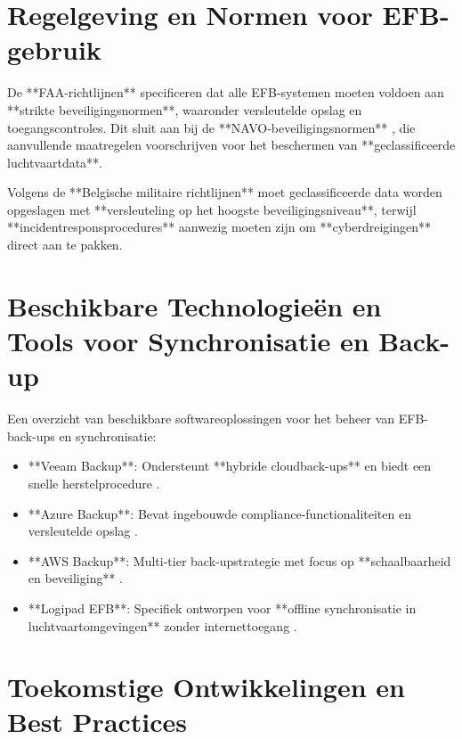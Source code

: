 \documentclass{hogent-article}
\begin{document}
        \section{Regelgeving en Normen voor EFB-gebruik}
        
        De **FAA-richtlijnen** \autocite{FAA_AC91-78A} specificeren dat alle EFB-systemen moeten voldoen aan **strikte beveiligingsnormen**, waaronder versleutelde opslag en toegangscontroles. Dit sluit aan bij de **NAVO-beveiligingsnormen** \autocite{AD070001}, die aanvullende maatregelen voorschrijven voor het beschermen van **geclassificeerde luchtvaartdata**.
        
        Volgens de **Belgische militaire richtlijnen** \autocite{ACISAPGSECVEIL001} moet geclassificeerde data worden opgeslagen met **versleuteling op het hoogste beveiligingsniveau**, terwijl **incidentresponsprocedures** aanwezig moeten zijn om **cyberdreigingen** direct aan te pakken.
        
        \section{Beschikbare Technologieën en Tools voor Synchronisatie en Back-up}
        
        Een overzicht van beschikbare softwareoplossingen voor het beheer van EFB-back-ups en synchronisatie:
        
        \begin{itemize}
            \item **Veeam Backup**: Ondersteunt **hybride cloudback-ups** en biedt een snelle herstelprocedure \autocite{VeeamRTO}.
            \item **Azure Backup**: Bevat ingebouwde compliance-functionaliteiten en versleutelde opslag \autocite{MicrosoftBackup}.
            \item **AWS Backup**: Multi-tier back-upstrategie met focus op **schaalbaarheid en beveiliging** \autocite{AWSBackup}.
            \item **Logipad EFB**: Specifiek ontworpen voor **offline synchronisatie in luchtvaartomgevingen** zonder internettoegang \autocite{LogipadEFB}.
        \end{itemize}
        
        \section{Toekomstige Ontwikkelingen en Best Practices}
        
\end{document}
